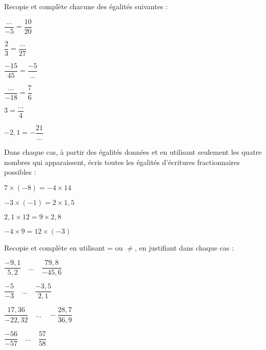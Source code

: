 \begin{exercice}[Égalités]

Recopie et complète chacune des égalités suivantes :

\begin{colenumerate}{2} 
\item $\dfrac{...}{-5} = \dfrac{10}{20}$
\item $\dfrac{2}{3} = \dfrac{...}{27}$
\item $\dfrac{-15}{45} = \dfrac{-5}{...}$
\item $\dfrac{...}{-18} = \dfrac{7}{6}$
\item $3 = \dfrac{...}{4}$
\item $-2,1 = -\dfrac{21}{...}$
\end{colenumerate} 
 
\end{exercice}

\begin{exercice}

Dans chaque cas, à partir des égalités données et en utilisant seulement les quatre nombres qui apparaissent, écris toutes les égalités d'écritures fractionnaires possibles :

\begin{colenumerate}{2} 
\item $7 \times (-8) = -4 \times 14$
\item $-3 \times (-1) = 2 \times 1,5$
\item $2,1 \times 12 = 9 \times 2,8$
\item $-4 \times 9 = 12 \times (-3)$
\end{colenumerate} 
 
\end{exercice}

\begin{exercice}[Égalité ?]
Recopie et complète en utilisant = ou $\neq$, en justifiant dans chaque cas :

\begin{colenumerate}{1} 
\item $\dfrac{-9,1}{5,2} \quad ... \quad \dfrac{79,8}{-45,6}$ 
\item $\dfrac{-5}{-3} \quad ... \quad \dfrac{-3,5}{2,1}$
\item $\dfrac{17,36}{-22,32} \quad ... \quad -\dfrac{28,7}{36,9}$
\item $\dfrac{-56}{-57} \quad ... \quad \dfrac{57}{58}$
\end{colenumerate} 
\end{exercice}


